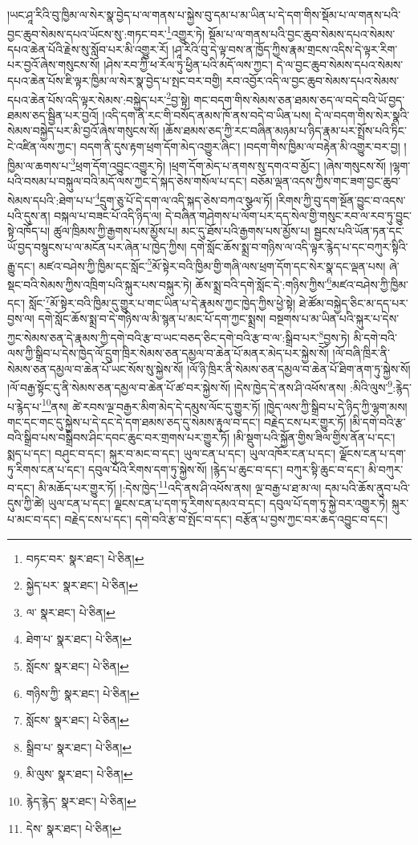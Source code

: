 །ཡང་ཤཱ་རིའི་བུ་ཁྱིམ་ལ་སེར་སྣ་བྱེད་པ་ལ་གནས་པ་སྐྱེས་བུ་དམ་པ་མ་ཡིན་པ་དེ་དག་གིས་སྡོམ་པ་ལ་གནས་པའི་བྱང་ཆུབ་སེམས་དཔའ་ཡོངས་སུ་:གཏང་བར་\footnote{བཏང་བར་  སྣར་ཐང་།  པེ་ཅིན། }འགྱུར་ཏེ། སྡོམ་པ་ལ་གནས་པའི་བྱང་ཆུབ་སེམས་དཔའ་སེམས་དཔའ་ཆེན་པོའི་རྗེས་སུ་སློབ་པར་མི་འགྱུར་རོ། །ཤཱ་རིའི་བུ་དེ་ལྟ་བས་ན་ཁྱོད་ཀྱིས་རྣམ་གྲངས་འདིས་དེ་ལྟར་རིག་པར་བྱའོ་ཞེས་གསུངས་སོ། །ཤེས་རབ་ཀྱི་ཕ་རོལ་ཏུ་ཕྱིན་པའི་མདོ་ལས་ཀྱང་། དེ་ལ་བྱང་ཆུབ་སེམས་དཔའ་སེམས་དཔའ་ཆེན་པོས་ཇི་ལྟར་ཁྱིམ་ལ་སེར་སྣ་བྱེད་པ་སྤང་བར་བགྱི། རབ་འབྱོར་འདི་ལ་བྱང་ཆུབ་སེམས་དཔའ་སེམས་དཔའ་ཆེན་པོས་འདི་ལྟར་སེམས་:བསྐྱེད་པར་\footnote{སྐྱེད་པར་  སྣར་ཐང་།  པེ་ཅིན། }བྱ་སྟེ། གང་བདག་གིས་སེམས་ཅན་ཐམས་ཅད་ལ་བདེ་བའི་ཡོ་བྱད་ཐམས་ཅད་སྦྱིན་པར་བྱའོ། །འདི་དག་ནི་རང་གི་བསོད་ནམས་ཁོ་ནས་བདེ་བ་ཡིན་པས། དེ་ལ་བདག་གིས་སེར་སྣའི་སེམས་བསྐྱེད་པར་མི་བྱའོ་ཞེས་གསུངས་སོ། །ཆོས་ཐམས་ཅད་ཀྱི་རང་བཞིན་མཉམ་པ་ཉིད་རྣམ་པར་སྤྲོས་པའི་ཏིང་ངེ་འཛིན་ལས་ཀྱང་། བདག་ནི་དུས་རྟག་ཕྲག་དོག་མེད་འགྱུར་ཞིང་། །བདག་གིས་ཁྱིམ་ལ་བརྟེན་མི་འགྱུར་བར་བྱ། །ཁྱིམ་ལ་ཆགས་པ་\footnote{ལ་  སྣར་ཐང་།  པེ་ཅིན། }ཕྲག་དོག་འབྱུང་འགྱུར་ཏེ། །ཕྲག་དོག་མེད་པ་ནགས་སུ་དགའ་བ་མྱོང་། །ཞེས་གསུངས་སོ། །ལྷག་པའི་བསམ་པ་བསྐུལ་བའི་མདོ་ལས་ཀྱང་དེ་སྐད་ཅེས་གསོལ་པ་དང་། བཅོམ་ལྡན་འདས་ཀྱིས་གང་ཟག་བྱང་ཆུབ་སེམས་དཔའི་:ཐེག་པ་པ་\footnote{ཐེག་པ་  སྣར་ཐང་།  པེ་ཅིན། }དྲུག་ཅུ་པོ་དེ་དག་ལ་འདི་སྐད་ཅེས་བཀའ་སྩལ་ཏོ། །རིགས་ཀྱི་བུ་དག་སྔོན་བྱུང་བ་འདས་པའི་དུས་ན། བསྐལ་པ་བཟང་པོ་འདི་ཉིད་ལ། དེ་བཞིན་གཤེགས་པ་ལོག་པར་དད་སེལ་གྱི་གསུང་རབ་ལ་རབ་ཏུ་བྱུང་སྟེ་འཁོད་པ། ཚུལ་ཁྲིམས་ཀྱི་རྒྱགས་པས་མྱོས་པ། མང་དུ་ཐོས་པའི་རྒྱགས་པས་མྱོས་པ། སྦྱངས་པའི་ཡོན་ཏན་དང་ཡོ་བྱད་བསྙུངས་པ་ལ་མངོན་པར་ཞེན་པ་ཁྱེད་ཀྱིས། དགེ་སློང་ཆོས་སྨྲ་བ་གཉིས་ལ་འདི་ལྟར་རྙེད་པ་དང་བཀུར་སྟིའི་རྒྱུ་དང་། མཛའ་བཤེས་ཀྱི་ཁྱིམ་དང་སློང་\footnote{སློངས་  སྣར་ཐང་།  པེ་ཅིན། }མོ་སྟེར་བའི་ཁྱིམ་གྱི་གཞི་ལས་ཕྲག་དོག་དང་སེར་སྣ་དང་ལྡན་པས། ཞེ་སྡང་བའི་སེམས་ཀྱིས་འཁྲིག་པའི་སྐུར་པས་བསྐུར་ཏེ། ཆོས་སྨྲ་བའི་དགེ་སློང་དེ་:གཉིས་ཀྱིས་\footnote{གཉིས་ཀྱི་  སྣར་ཐང་།  པེ་ཅིན། }མཛའ་བཤེས་ཀྱི་ཁྱིམ་དང་། སློང་\footnote{སློངས་  སྣར་ཐང་།  པེ་ཅིན། }མོ་སྟེར་བའི་ཁྱིམ་དུ་གྱུར་པ་གང་ཡིན་པ་དེ་རྣམས་ཀྱང་ཁྱེད་ཀྱིས་ཕྱེ་སྟེ། ཐེ་ཚོམ་བསྐྱེད་ཅིང་མ་དད་པར་བྱས་ལ། དགེ་སློང་ཆོས་སྨྲ་བ་དེ་གཉིས་ལ་མི་སྙན་པ་མང་པོ་དག་ཀྱང་སྨྲས། བསྔགས་པ་མ་ཡིན་པའི་སྐུར་པ་དེས་ཀྱང་སེམས་ཅན་དེ་རྣམས་ཀྱི་དགེ་བའི་རྩ་བ་ཡང་བཅད་ཅིང་དགེ་བའི་རྩ་བ་ལ་:སྒྲིབ་པར་\footnote{སྒྲིབ་པ་  སྣར་ཐང་།  པེ་ཅིན། }བྱས་ཏེ། མི་དགེ་བའི་ལས་ཀྱི་སྒྲིབ་པ་དེས་ཁྱེད་ལོ་དྲུག་ཁྲིར་སེམས་ཅན་དམྱལ་བ་ཆེན་པོ་མནར་མེད་པར་སྐྱེས་སོ། །ལོ་བཞི་ཁྲིར་ནི་སེམས་ཅན་དམྱལ་བ་ཆེན་པོ་ཡང་སོས་སུ་སྐྱེས་སོ། །ལོ་ཉི་ཁྲིར་ནི་སེམས་ཅན་དམྱལ་བ་ཆེན་པོ་ཐིག་ནག་ཏུ་སྐྱེས་སོ། །ལོ་བརྒྱ་སྟོང་དུ་ནི་སེམས་ཅན་དམྱལ་བ་ཆེན་པོ་ཚ་བར་སྐྱེས་སོ། །དེས་ཁྱེད་དེ་ནས་ཤི་འཕོས་ནས། :མིའི་ལུས་\footnote{མི་ལུས་  སྣར་ཐང་།  པེ་ཅིན། }:རྙེད་པ་རྙེད་པ་\footnote{རྙེད་རྙེད་  སྣར་ཐང་།  པེ་ཅིན། }ནས། ཚེ་རབས་ལྔ་བརྒྱར་མིག་མེད་དེ་དམུས་ལོང་དུ་གྱུར་ཏོ། །ཁྱེད་ལས་ཀྱི་སྒྲིབ་པ་དེ་ཉིད་ཀྱི་ལྷག་མས། གང་དང་གང་དུ་སྐྱེས་པ་དེ་དང་དེ་དག་ཐམས་ཅད་དུ་སེམས་རྟུལ་བ་དང་། བརྗེད་ངས་པར་གྱུར་ཏོ། །མི་དགེ་བའི་རྩ་བའི་སྒྲིབ་པས་བསྒྲིབས་ཤིང་དབང་ཆུང་བར་གྲགས་པར་གྱུར་ཏོ། །མི་སྡུག་པའི་སྐྱོན་གྱིས་ཟིལ་གྱིས་ནོན་པ་དང་། སྨད་པ་དང་། བཤུང་བ་དང་། སྐུར་བ་མང་བ་དང་། ཡུལ་ངན་པ་དང་། ཡུལ་འཁོར་ངན་པ་དང་། ལྗོངས་ངན་པ་དག་ཏུ་རིགས་ངན་པ་དང་། དབུལ་པོའི་རིགས་དག་ཏུ་སྐྱེས་སོ། །རྙེད་པ་ཆུང་བ་དང་། བཀུར་སྟི་ཆུང་བ་དང་། མི་བཀུར་བ་དང་། མི་མཆོད་པར་གྱུར་ཏོ། །:དེས་ཁྱེད་\footnote{དེས་  སྣར་ཐང་།  པེ་ཅིན། }འདི་ནས་ཤི་འཕོས་ནས། ལྔ་བརྒྱ་པ་ཐ་མ་ལ། དམ་པའི་ཆོས་ནུབ་པའི་དུས་ཀྱི་ཚེ། ཡུལ་ངན་པ་དང་། ལྗངས་ངན་པ་དག་ཏུ་རིགས་དམའ་བ་དང་། དབུལ་པོ་དག་ཏུ་སྐྱེ་བར་འགྱུར་ཏེ། སྐུར་པ་མང་བ་དང་། བརྗེད་ངས་པ་དང་། དགེ་བའི་རྩ་བ་སྤོང་བ་དང་། བརྩོན་པ་བྱས་ཀྱང་བར་ཆད་འབྱུང་བ་དང་། 